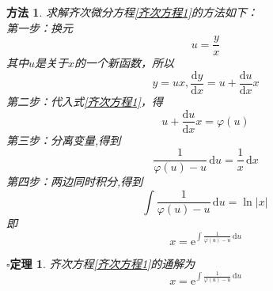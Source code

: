 \documentclass[12pt,a4paper]{book}
\numberwithin{equation}{section}
\newtheorem{method}{\hspace*{0.3cm}\color{ff}\textleaf 方法}[section]
\newtheorem{theorem}{\hspace*{0.3cm}\color{dl} $ \square  $定理}[section]
\begin{document}
\begin{method}
    \hspace*{0.3cm}求解齐次微分方程\eqref{齐次方程1}的方法如下：\\
    第一步：换元
    $$u=\frac{y}{x}$$
    其中$u$是关于$x$的一个新函数，所以
    $$y=ux,\frac{\mathrm{d}y}{\mathrm{d}x}=u+\frac{\mathrm{d}u}{\mathrm{d}x}x$$
    第二步：代入式\eqref{齐次方程1}，得
    $$u+\frac{\mathrm{d}u}{\mathrm{d}x}x=\varphi (u)$$
    第三步：分离变量,得到
    $$\frac{1}{\varphi (u)-u}\,\mathrm{d}u=\frac{1}{x}\,\mathrm{d}x$$
    第四步：两边同时积分,得到
    $$\int \frac{1}{\varphi (u)-u}\,\mathrm{d}u=\ln|x|\,$$
    即
    $$x=\mathrm{e}^{\int \frac{1}{\varphi (u)-u}\,\mathrm{d}u}$$
\end{method}

\begin{theorem}
    \hspace{0.3cm}齐次方程\eqref{齐次方程1}的通解为
    \begin{equation}
        x=\mathrm{e}^{\int \frac{1}{\varphi (u)-u}\,\mathrm{d}u}
        \label{齐次方程的通解}
    \end{equation}

\end{theorem}
\end{document}
